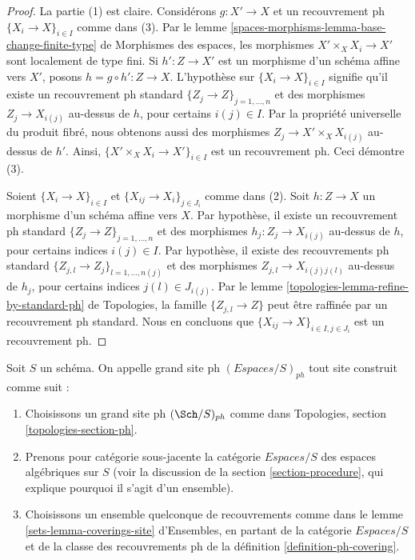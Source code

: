 \begin{proof}
La partie (1) est claire. Considérons $g : X' \to X$ et
un recouvrement ph $\{X_i \to X\}_{i\in I}$ comme dans (3). Par le
lemme \ref{spaces-morphisms-lemma-base-change-finite-type} de Morphismes des espaces,
les morphismes $X' \times_X X_i \to X'$ sont localement de type fini.
Si $h' : Z \to X'$ est un morphisme d'un schéma affine
vers $X'$, posons $h = g \circ h' : Z \to X$. L'hypothèse
sur $\{X_i \to X\}_{i\in I}$ signifie qu'il existe un recouvrement ph standard
$\{Z_j \to Z\}_{j = 1, \ldots, n}$ et des morphismes $Z_j \to X_{i(j)}$ au-dessus de
$h$, pour certains $i(j) \in I$. Par la propriété universelle du produit fibré,
nous obtenons aussi des morphismes $Z_j \to X' \times_X X_{i(j)}$ au-dessus de $h'$.
Ainsi, $\{X' \times_X X_i \to X'\}_{i\in I}$ est un recouvrement ph.
Ceci démontre (3).

\medskip\noindent
Soient $\{X_i \to X\}_{i\in I}$ et $\{X_{ij} \to X_i\}_{j\in J_i}$ comme
dans (2). Soit $h : Z \to X$ un morphisme d'un schéma affine vers $X$.
Par hypothèse, il existe un recouvrement ph standard
$\{Z_j \to Z\}_{j = 1, \ldots, n}$ et des morphismes $h_j : Z_j \to X_{i(j)}$
au-dessus de $h$, pour certains indices $i(j) \in I$. Par hypothèse, il existe des
recouvrements ph standard
$\{Z_{j, l} \to Z_j\}_{l = 1, \ldots, n(j)}$
et des morphismes $Z_{j, l} \to X_{i(j)j(l)}$ au-dessus de
$h_j$, pour certains indices $j(l) \in J_{i(j)}$. Par le
lemme \ref{topologies-lemma-refine-by-standard-ph} de Topologies,
la famille $\{Z_{j, l} \to Z\}$ peut être raffinée par un recouvrement ph standard.
Nous en concluons que $\{X_{ij} \to X\}_{i \in I, j\in J_i}$
est un recouvrement ph.
\end{proof}

\begin{definition}
\label{definition-big-ph-site}
Soit $S$ un schéma. On appelle grand site ph {\it $(\textit{Espaces}/S)_{ph}$}
tout site construit comme suit :
\begin{enumerate}
\item Choisissons un grand site ph $(\Sch/S)_{ph}$ comme dans
Topologies, section \ref{topologies-section-ph}.
\item Prenons pour catégorie sous-jacente la catégorie $\textit{Espaces}/S$
des espaces algébriques sur $S$ (voir la discussion de la
section \ref{section-procedure}, qui explique pourquoi il s'agit d'un ensemble).
\item Choisissons un ensemble quelconque de recouvrements comme dans le
lemme \ref{sets-lemma-coverings-site} d'Ensembles, en partant de la
catégorie $\textit{Espaces}/S$ et de la classe des recouvrements ph
de la définition \ref{definition-ph-covering}.
\end{enumerate}
\end{definition}

